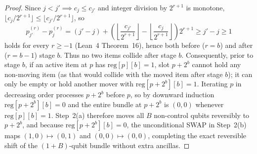 \documentclass[11pt,a4paper]{article}
\theoremstyle{remark}
\begin{document}
\begin{proof}
Since $j < j' \implies c_j \le c_{j'}$ and integer division by $2^{r+1}$ is monotone, $\lfloor c_j / 2^{r+1} \rfloor \le \lfloor c_{j'} / 2^{r+1} \rfloor$, so
\begin{equation}
p_{j'}^{(r)} - p_j^{(r)} = (j' - j) + \left(\left\lfloor \frac{c_{j'}}{2^{r+1}} \right\rfloor - \left\lfloor \frac{c_j}{2^{r+1}} \right\rfloor\right) 2^{r+1} \ge j' - j \ge 1
\end{equation}
holds for every $r \ge -1$ (Lean~4 Theorem~16), hence both before ($r = b$) and after ($r = b - 1$) stage $b$. Thus no two items collide after stage $b$. Consequently, prior to stage $b$, if an active item at $p$ has $\mathrm{reg}[p][b] = 1$, slot $p + 2^b$ cannot hold any non-moving item (as that would collide with the moved item after stage $b$); it can only be empty or hold another mover with $\mathrm{reg}[p+2^b][b] = 1$. Iterating $p$ in decreasing order processes $p + 2^b$ before $p$, so by downward induction $\mathrm{reg}[p + 2^b][b] = 0$ and the entire bundle at $p + 2^b$ is $(0, 0)$ whenever $\mathrm{reg}[p][b] = 1$. Step~2(a) therefore moves all $B$ non-control qubits reversibly to $p + 2^b$, and because $\mathrm{reg}[p+2^b][b] = 0$, the unconditional SWAP in Step~2(b) maps $(1,0) \mapsto (0,1)$ and $(0,0) \mapsto (0,0)$, completing the exact reversible shift of the $(1+B)$-qubit bundle without extra ancillas.


\end{proof}
\end{document}
